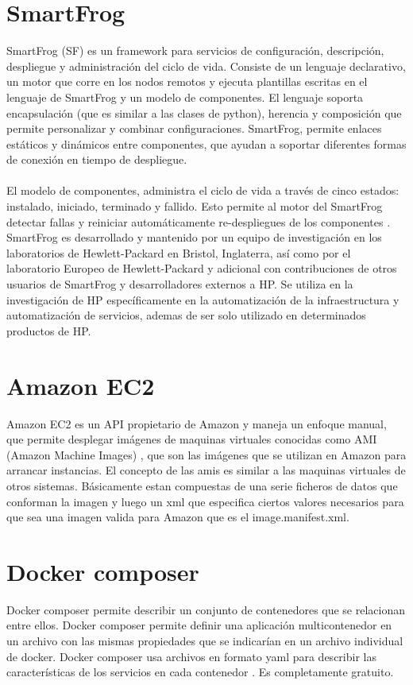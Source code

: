 \section{SmartFrog}
SmartFrog (SF) es un framework para servicios de configuración, descripción, despliegue y administración del ciclo de vida. Consiste de un lenguaje declarativo, un motor que corre en los nodos remotos y ejecuta plantillas escritas en el lenguaje de SmartFrog y un modelo de componentes. El lenguaje soporta encapsulación (que es similar a las clases de python), herencia y composición que permite personalizar y combinar configuraciones. SmartFrog, permite enlaces estáticos y dinámicos entre componentes, que ayudan a soportar diferentes formas de conexión en tiempo de despliegue.\\
\\
El modelo de componentes, administra el ciclo de vida a través de cinco estados: instalado, iniciado, terminado y fallido. Esto permite al motor del SmartFrog detectar fallas y reiniciar automáticamente re-despliegues de los componentes \cite{Smart09}.
\\
SmartFrog es desarrollado y mantenido por un equipo de investigación en los laboratorios de Hewlett-Packard en Bristol, Inglaterra, así como por el laboratorio Europeo de Hewlett-Packard y adicional con contribuciones de otros usuarios de SmartFrog y desarrolladores externos a HP. Se utiliza en la investigación de HP específicamente en la automatización de la infraestructura y automatización de servicios, ademas de ser solo utilizado en determinados productos de HP.

\section{Amazon EC2}
Amazon EC2 es un API propietario de Amazon y maneja un enfoque manual, que permite desplegar imágenes de maquinas virtuales conocidas como AMI (Amazon Machine Images) \cite{Amazon16}, que son las imágenes que se utilizan en Amazon para arrancar instancias. El concepto de las amis es similar a las maquinas virtuales de otros sistemas. Básicamente estan compuestas de una serie ficheros de datos que conforman la imagen y luego un xml que especifica ciertos valores necesarios para que sea una imagen valida para Amazon que es el image.manifest.xml. 

\section{Docker composer}
Docker composer permite describir un conjunto de contenedores que se relacionan entre ellos. Docker composer permite definir una aplicación multicontenedor en un archivo con las mismas propiedades que se indicarían en un archivo individual de docker. Docker composer usa archivos en formato yaml para describir las características de los servicios en cada contenedor \cite{doccom16}. Es completamente gratuito. 


